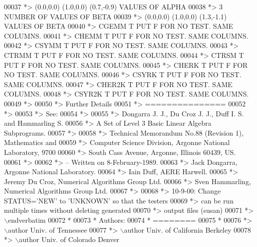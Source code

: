 \begin{DoxyCode}
00037 \textcolor{comment}{*> (0.0,0.0) (1.0,0.0) (0.7,-0.9)       VALUES OF ALPHA}
00038 \textcolor{comment}{*> 3                 NUMBER OF VALUES OF BETA}
00039 \textcolor{comment}{*> (0.0,0.0) (1.0,0.0) (1.3,-1.1)       VALUES OF BETA}
00040 \textcolor{comment}{*> CGEMM  T PUT F FOR NO TEST. SAME COLUMNS.}
00041 \textcolor{comment}{*> CHEMM  T PUT F FOR NO TEST. SAME COLUMNS.}
00042 \textcolor{comment}{*> CSYMM  T PUT F FOR NO TEST. SAME COLUMNS.}
00043 \textcolor{comment}{*> CTRMM  T PUT F FOR NO TEST. SAME COLUMNS.}
00044 \textcolor{comment}{*> CTRSM  T PUT F FOR NO TEST. SAME COLUMNS.}
00045 \textcolor{comment}{*> CHERK  T PUT F FOR NO TEST. SAME COLUMNS.}
00046 \textcolor{comment}{*> CSYRK  T PUT F FOR NO TEST. SAME COLUMNS.}
00047 \textcolor{comment}{*> CHER2K T PUT F FOR NO TEST. SAME COLUMNS.}
00048 \textcolor{comment}{*> CSYR2K T PUT F FOR NO TEST. SAME COLUMNS.}
00049 \textcolor{comment}{*>}
00050 \textcolor{comment}{*> Further Details}
00051 \textcolor{comment}{*> ===============}
00052 \textcolor{comment}{*>}
00053 \textcolor{comment}{*> See:}
00054 \textcolor{comment}{*>}
00055 \textcolor{comment}{*>    Dongarra J. J., Du Croz J. J., Duff I. S. and Hammarling S.}
00056 \textcolor{comment}{*>    A Set of Level 3 Basic Linear Algebra Subprograms.}
00057 \textcolor{comment}{*>}
00058 \textcolor{comment}{*>    Technical Memorandum No.88 (Revision 1), Mathematics and}
00059 \textcolor{comment}{*>    Computer Science Division, Argonne National Laboratory, 9700}
00060 \textcolor{comment}{*>    South Cass Avenue, Argonne, Illinois 60439, US.}
00061 \textcolor{comment}{*>}
00062 \textcolor{comment}{*> -- Written on 8-February-1989.}
00063 \textcolor{comment}{*>    Jack Dongarra, Argonne National Laboratory.}
00064 \textcolor{comment}{*>    Iain Duff, AERE Harwell.}
00065 \textcolor{comment}{*>    Jeremy Du Croz, Numerical Algorithms Group Ltd.}
00066 \textcolor{comment}{*>    Sven Hammarling, Numerical Algorithms Group Ltd.}
00067 \textcolor{comment}{*>}
00068 \textcolor{comment}{*>    10-9-00:  Change STATUS='NEW' to 'UNKNOWN' so that the testers}
00069 \textcolor{comment}{*>              can be run multiple times without deleting generated}
00070 \textcolor{comment}{*>              output files (susan)}
00071 \textcolor{comment}{*> \(\backslash\)endverbatim}
00072 \textcolor{comment}{*}
00073 \textcolor{comment}{*  Authors:}
00074 \textcolor{comment}{*  ========}
00075 \textcolor{comment}{*}
00076 \textcolor{comment}{*> \(\backslash\)author Univ. of Tennessee }
00077 \textcolor{comment}{*> \(\backslash\)author Univ. of California Berkeley }
00078 \textcolor{comment}{*> \(\backslash\)author Univ. of Colorado Denver }

\end{DoxyCode}
